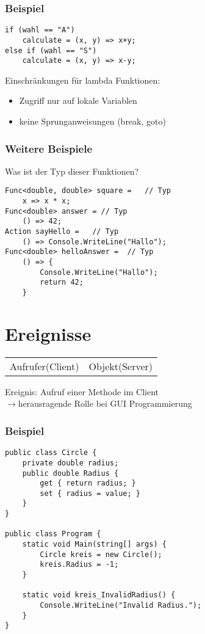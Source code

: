 \subsubsection*{Beispiel}
\begin{lstlisting}[language={[Sharp]C}]
if (wahl == "A")
	calculate = (x, y) => x+y;
else if (wahl == "S")
	calculate = (x, y) => x-y;
\end{lstlisting}

Einschränkungen für lambda Funktionen:
\begin{itemize}
\item Zugriff nur auf lokale Variablen
\item keine Sprunganweisungen (break, goto)
\end{itemize}

\subsubsection*{Weitere Beispiele}
Was ist der Typ dieser Funktionen? 
\begin{lstlisting}[language={[Sharp]C}]
Func<double, double> square =	// Typ
	x => x * x;
Func<double> answer = // Typ
	() => 42;
Action sayHello =	// Typ
	() => Console.WriteLine("Hallo");
Func<double> helloAnswer =	// Typ
	() => { 
		Console.WriteLine("Hallo");
		return 42;
	}
\end{lstlisting}

\section{Ereignisse}

\begin{center}
\begin{tabular}{L{.3}L{.3}}
Aufrufer\newline (Client) &  Objekt\newline (Server)
\end{tabular}
\end{center}
Ereignis: Aufruf einer Methode im Client\\
$\to$herausragende Rolle bei GUI Programmierung

\subsubsection*{Beispiel}
\begin{lstlisting}[language={[Sharp]C}]
public class Circle {
	private double radius;
	public double Radius {
		get { return radius; }
		set { radius = value; }
	}
}

public class Program {  
	static void Main(string[] args) {
		Circle kreis = new Circle();
		kreis.Radius = -1;
	}
	
	static void kreis_InvalidRadius() {
		Console.WriteLine("Invalid Radius.");  
	}
}
\end{lstlisting}

